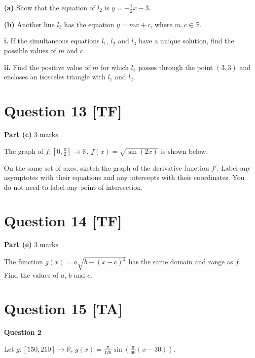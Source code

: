 \documentclass[12pt,a4paper]{article}
\begin{document}
\textbf{(a)} Show that the equation of $l_2$ is $y = -\frac{1}{2}x - 3$.

\textbf{(b)} Another line $l_3$ has the equation $y = mx + c$, where $m,c \in \mathbb{R}$.

\textbf{i.} If the simultaneous equations $l_1$, $l_2$ and $l_3$ have a unique solution, find the possible values of $m$ and $c$.

\textbf{ii.} Find the positive value of $m$ for which $l_3$ passes through the point $(3,3)$ and encloses an isosceles triangle with $l_1$ and $l_2$.

\vspace{5\baselineskip}

\hrulefill

\section*{Question 13 [TF]}

\textbf{Part (c)} \hfill 3 marks

The graph of $f : \left[0, \frac{\pi}{2}\right] \to \mathbb{R}$, $f(x) = \sqrt{\sin(2x)}$ is shown below.

On the same set of axes, sketch the graph of the derivative function $f'$. Label any asymptotes with their equations and any intercepts with their coordinates. You do not need to label any point of intersection.

\vspace{5\baselineskip}

\hrulefill

\section*{Question 14 [TF]}

\textbf{Part (e)} \hfill 3 marks

The function $g(x) = a\sqrt{b - (x - c)^2}$ has the same domain and range as $f$. Find the values of $a$, $b$ and $c$.

\vspace{5\baselineskip}

\hrulefill

\section*{Question 15 [TA]}

\textbf{Question 2}

Let $g : [150,210] \to \mathbb{R}$, $g(x) = \frac{\pi}{120}\sin\left(\frac{\pi}{60}(x - 30)\right)$.
\end{document}
